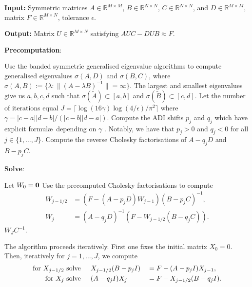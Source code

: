 \documentclass[hidelinks,onefignum,onetabnum]{siamart220329}
\def\bfzero{{\bf 0}}
\def\bbR{{\mathbb R}}
\begin{document}
\begin{algorithm}[tb]
	\caption{Generalised Alternating Direction Implicit (ADI)}\label{Algorithm:ADI}
	
	{\noindent\bf Input:} {Symmetric matrices $A \in \bbR^{M \times M}$, $B \in \bbR^{N \times N}$,  $C \in \bbR^{N \times N}$,  and  $D \in \bbR^{M \times M}$,  matrix $F \in \bbR^{M \times N}$, tolerance $\epsilon$.}
	
	{\noindent\bf Output:} {Matrix $U \in \bbR^{M \times N}$ satisfying   $A U C -  D U B  \approx F$. }
	
	\smallskip
	{\bf Precomputation}:
\begin{algorithmic}[1]
	\STATE Use the banded symmetric generalised eigenvalue algorithms \cite{crawford1973reduction} to compute generalised eigenvalues  $\sigma(A, D)$  and  $\sigma(B, C)$, where $\sigma(A,B) := \{\lambda : \|(A - \lambda B)^{-1}\| = \infty\}$. The largest and smallest eigenvalues
	give us $a, b, c, d$ such that $\sigma(\tilde A) \subset [a, b]$ and $\sigma(\tilde B) \subset [c, d]$. 
	\STATE Let the number of iterations equal $J = \lceil \log(16 \gamma) \log(4/\epsilon)/\pi^2 \rceil$ where $\gamma = |c-a||d-b|/(|c-b||d-a|)$.
	\STATE Compute the ADI shifts $p_j$ and $q_j$ which have explicit formul\ae\ depending on $\gamma$ \cite[Eq.~(2.4)]{fortunato2020fast}. Notably, we have that $p_j > 0$ and $q_j < 0$ for all $j \in \{1,\ldots,J\}$.
	\STATE Compute the reverse Cholesky factorisations of $ A -  q_j  D $ and $ B - p_j  C $.
	\ENDFOR
	\end{algorithmic}

{\bf Solve}:
\begin{algorithmic}[1]
	\STATE Let $W_0 = \bfzero$
	\STATE Use the precomputed Cholesky factorisations to compute
\begin{align*}
	W_{j-1/2} &=  (F - (A - p_j D)W_{j-1}) (B-p_j C)^{-1},  \\
	W_{j} &=  (A-q_j D)^{-1}(F - W_{j-1/2}(B-q_j C)).  
\end{align*}
	\ENDFOR
	\RETURN $W_J  C^{-1}$.
\end{algorithmic}
\end{algorithm}
	



The algorithm proceeds iteratively. First one fixes the initial matrix $X_0 = 0$. Then, iteratively for $j =  1,\dots,J$, we compute
\begin{alignat}{2}
\text{for $X_{j-1/2}$ solve \;\;\;\;}& X_{j-1/2} (B - p_j I) &&= F - (A-p_jI) X_{j-1} \label{eq:adi:1},\\ 
\text{for $X_{j}$ solve \;\;\;\;}& (A-q_jI)X_{j} &&= F - X_{j-1/2}(B-q_j I). \label{eq:adi:2}
\end{alignat}
\end{document}

